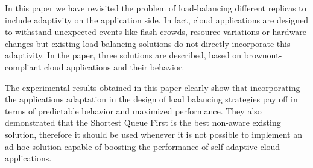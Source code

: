 In this paper we have revisited the problem of load-balancing
different replicas to include adaptivity on the application side. In
fact, cloud applications are designed to withstand unexpected events
like flash crowds, resource variations or hardware changes but
existing load-balancing solutions do not directly incorporate this
adaptivity. In the paper, three solutions are described, based on
brownout-compliant cloud applications and their behavior.

The experimental results obtained in this paper clearly show that
incorporating the applications adaptation in the design of load
balancing strategies pay off in terms of predictable behavior and
maximized performance. They also demonstrated that the Shortest Queue
First is the best non-aware existing solution, therefore it should be
used whenever it is not possible to implement an ad-hoc solution
capable of boosting the performance of self-adaptive cloud
applications.
